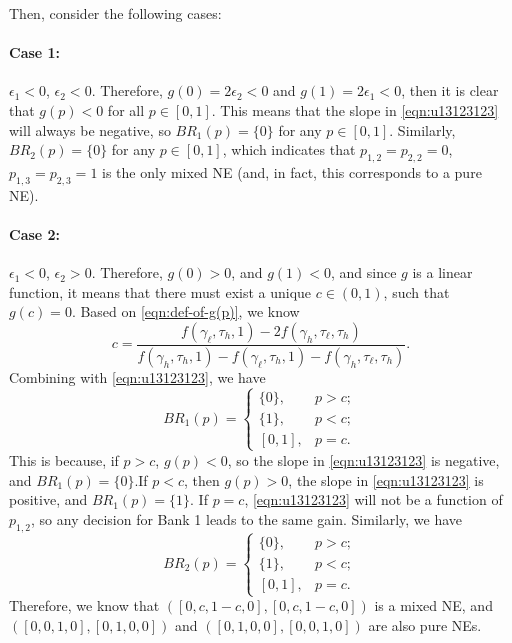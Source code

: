 Then, consider the following cases: 

\noindent \paragraph{Case 1:} $\epsilon_1<0$, $\epsilon_2<0$. Therefore, $g(0)=2\epsilon_2<0$ and  $g(1)=2\epsilon_1<0$, 
then it is clear that $g(p)<0$ for all $p\in[0,1]$. 
This means that the slope in \eqref{eqn:u13123123} will always be negative, so $BR_1(p)= \{0\}$ for any $p\in[0,1]$. Similarly, $BR_2(p)=\{0\}$ for any $p\in[0,1]$, which indicates that $p_{1,2}=p_{2,2}=0$, $p_{1,3}=p_{2,3}=1$ is the only mixed NE (and, in fact, this corresponds to a pure NE).

\noindent \paragraph{Case 2:} $\epsilon_1<0$, $\epsilon_2>0$. Therefore, $g(0)>0$, and $g(1)<0$, and since $g$ is a linear function, it means that there must exist a unique $c\in(0,1)$, such that $g(c)=0$. Based on \eqref{eqn:def-of-g(p)}, we know 
$$ c=\frac{f(\gamma_{\ell},\tau_h,1)-2f(\gamma_h,\tau_{\ell},\tau_h)}{f(\gamma_h,\tau_h,1)-f(\gamma_{\ell},\tau_h,1)-f(\gamma_h,\tau_{\ell},\tau_h)}.$$
Combining with \eqref{eqn:u13123123}, we have 
\begin{equation*}
BR_1(p)= 
    \begin{cases}
        \{0\}, & p>c;\\
        \{1\},  & p<c;\\
        [0,1], & p=c.
    \end{cases}
\end{equation*}
This is because, if $p>c$, $g(p)<0$, so the slope in \eqref{eqn:u13123123} is negative, and $BR_1(p)=\{0\}$.If $p<c$, then $g(p)>0$, the slope in \eqref{eqn:u13123123} is positive, and $BR_1(p)=\{1\}$. If $p=c$, \eqref{eqn:u13123123} will not be a function of $p_{1,2}$, so any decision for Bank 1 leads to the same gain. Similarly, we have 
\begin{equation*}
BR_2(p)= 
    \begin{cases}
        \{0\}, & p>c;\\
        \{1\},  & p<c;\\
        [0,1], & p=c.
    \end{cases}
\end{equation*}
Therefore, we know that $([0,c,1-c,0],[0,c,1-c,0])$ is a mixed NE, and $([0,0,1,0],[0,1,0,0])$ and $([0,1,0,0],[0,0,1,0])$ are also pure NEs. 

